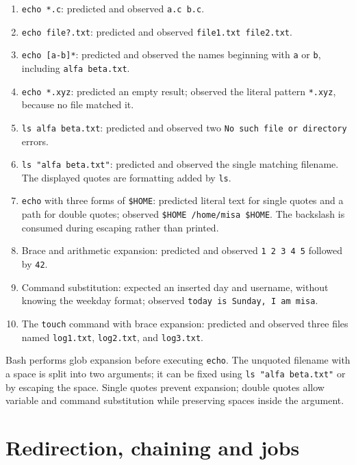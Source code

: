 \documentclass{tum_report}
\begin{document}
\begin{enumerate}[leftmargin=*,itemsep=2pt]
    \item \texttt{echo *.c}: predicted and observed \texttt{a.c b.c}.
    \item \texttt{echo file?.txt}: predicted and observed
    \texttt{file1.txt file2.txt}.
    \item \texttt{echo [a-b]*}: predicted and observed the names beginning
    with \texttt{a} or \texttt{b}, including \texttt{alfa beta.txt}.
    \item \texttt{echo *.xyz}: predicted an empty result; observed the literal
    pattern \texttt{*.xyz}, because no file matched it.
    \item \texttt{ls alfa beta.txt}: predicted and observed two
    \texttt{No such file or directory} errors.
    \item \texttt{ls "alfa beta.txt"}: predicted and observed the single
    matching filename. The displayed quotes are formatting added by
    \texttt{ls}.
    \item \texttt{echo} with three forms of \texttt{\$HOME}: predicted
    literal text for single quotes and a path for double quotes;
    observed \texttt{\$HOME /home/misa \$HOME}. The backslash is consumed
    during escaping rather than printed.
    \item Brace and arithmetic expansion: predicted and observed
    \texttt{1 2 3 4 5} followed by \texttt{42}.
    \item Command substitution: expected an inserted day and username,
    without knowing the weekday format; observed
    \texttt{today is Sunday, I am misa}.
    \item The \texttt{touch} command with brace expansion: predicted and
    observed three files named \texttt{log1.txt}, \texttt{log2.txt}, and
    \texttt{log3.txt}.
\end{enumerate}

Bash performs glob expansion before executing \texttt{echo}. The unquoted
filename with a space is split into two arguments; it can be fixed using
\texttt{ls "alfa beta.txt"} or by escaping the space. Single quotes prevent
expansion; double quotes allow variable and command substitution while
preserving spaces inside the argument.

\section{Redirection, chaining and jobs}
\end{document}
